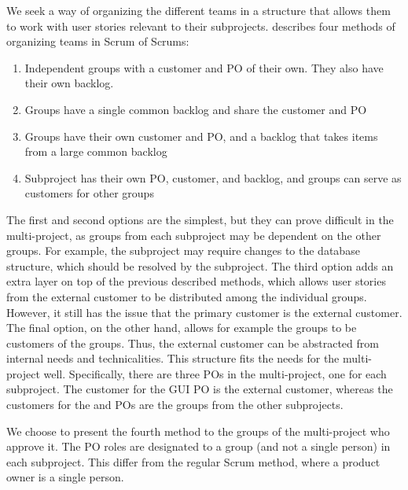 \begin{description}
  We seek a way of organizing the different teams in a structure that allows them to work with user stories relevant to their subprojects. \textcite{bird_davies_2007} describes four methods of organizing teams in Scrum of Scrums:
  \begin{enumerate}
    \item Independent groups with a customer and PO of their own. They also have their own backlog.
    \item Groups have a single common backlog and share the customer and PO
    \item Groups have their own customer and PO, and a backlog that takes items from a large common backlog
    \item Subproject has their own PO, customer, and backlog, and groups can serve as customers for other groups
  \end{enumerate}
  The first and second options are the simplest, but they can prove difficult in the multi-project, as groups from each subproject may be dependent on the other groups. For example, the \gui subproject may require changes to the database structure, which should be resolved by the \db subproject. The third option adds an extra layer on top of the previous described methods, which allows user stories from the external customer to be distributed among the individual groups. However, it still has the issue that the primary customer is the external customer. The final option, on the other hand, allows for example the \gui groups to be customers of the \bd groups. Thus, the external customer can be abstracted from internal needs and technicalities. This structure fits the needs for the multi-project well. Specifically, there are three POs in the multi-project, one for each subproject. The customer for the GUI PO is the external customer, whereas the customers for the \db and \bd POs are the groups from the other subprojects.

  We choose to present the fourth method to the groups of the multi-project who approve it. The PO roles are designated to a group (and not a single person) in each subproject. This differ from the regular Scrum method, where a product owner is a single person.


\end{description}
